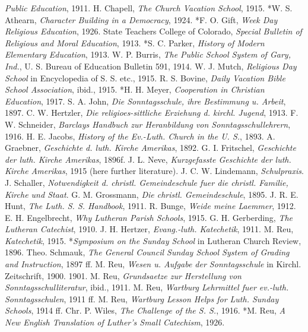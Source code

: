 \emph{Public Education}, 1911. H. Chapell, \emph{The Church Vacation School}, 1915. *W. S. Athearn, \emph{Character Building in a Democracy}, 1924. *F. O. Gift, \emph{Week Day Religious Education}, 1926. State Teachers College of Colorado, \emph{Special Bulletin of Religious and Moral Education}, 1913. *S. C. Parker, \emph{History of Modern Elementary Education}, 1913. W. P. Burris, \emph{The Public School System of Gary, Ind.}, U. S. Bureau of Education Bulletin 591, 1914. W. J. Mutch, \emph{Religious Day School} in Encyclopedia of S. S. etc., 1915. R. S. Bovine, \emph{Daily Vacation Bible School Association}, ibid., 1915. *H. H. Meyer, \emph{Cooperation in Christian Education}, 1917. S. A. John, \emph{Die Sonntagsschule, ihre Bestimmung u. Arbeit}, 1897. C. W. Hertzler, \emph{Die religioes-sittliche Erziehung d. kirchl. Jugend}, 1913. F. W. Schneider, \emph{Barclays Handbuch zur Heranbildung von Sonntagsschullehrern}, 1916. H. E. Jacobs, \emph{History of the Ev.-Luth. Church in the U. S.}, 1893. A. Graebner, \emph{Geschichte d. luth. Kirche Amerikas}, 1892. G. I. Fritschel, \emph{Geschichte der luth. Kirche Amerikas}, 1896f. J. L. Neve, \emph{Kurzgefasste \emph{Geschichte der luth. Kirche Amerikas}}, 1915 (here further literature). J. C. W. Lindemann, \emph{Schulpraxis}. J. Schaller, \emph{Notwendigkeit d. christl. Gemeindeschule fuer die christl. Familie, Kirche und Staat}. G. M. Grossmann, \emph{Die christl. Gemeindeschule}, 1895. J. R. E. Hunt, \emph{The Luth. S. S. Handbook}, 1911. R. Bunge, \emph{Weide meine Laemmer}, 1912. E. H. Engelbrecht, \emph{Why Lutheran Parish Schools}, 1915. G. H. Gerberding, \emph{The Lutheran Catechist}, 1910. J. H. Hertzer, \emph{Evang.-luth. \emph{Katechetik}}, 1911. M. Reu, \emph{Katechetik}, 1915. *\emph{Symposium on the Sunday School} in Lutheran Church Review, 1896. Theo. Schmauk, \emph{The General Council Sunday School System of Grading and Instruction}, 1897 ff. M. Reu, \emph{Wesen u. Aufgabe der Sonntagsschule} in Kirchl. Zeitschrift, 1900. 1901. M. Reu, \emph{Grundsaetze zur Herstellung von Sonntagsschulliteratur}, ibid., 1911. M. Reu, \emph{Wartburg Lehrmittel fuer ev.-luth. Sonntagsschulen}, 1911 ff. M. Reu, \emph{Wartburg Lesson Helps for Luth. Sunday Schools}, 1914 ff. Chr. P. Wiles, \emph{The Challenge of the S. S.}, 1916. *M. Reu, \emph{A New English Translation of Luther’s Small Catechism}, 1926.

